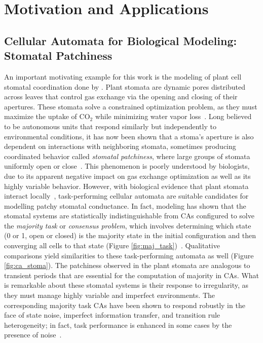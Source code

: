 \documentclass[a4paper,11pt]{report}
\begin{document}
\section{Motivation and Applications}
\label{sec:Motiv}
\subsection{Cellular Automata for Biological Modeling: Stomatal Patchiness}
\label{subsec:Stoma}
An important motivating example for this work is the modeling of plant cell stomatal coordination done by \citeauthor{pe04}. Plant stomata are dynamic pores distributed across leaves that control gas exchange via the opening and closing of their apertures. These stomata solve a constrained optimization problem, as they must maximize the uptake of CO$_\text{2}$ while minimizing water vapor loss~\cite{mo07,we11}. Long believed to be autonomous units that respond similarly but independently to environmental conditions, it has now been shown that a stoma's aperture is also dependent on interactions with neighboring stomata, sometimes producing coordinated behavior called \textit{stomatal patchiness}, where large groups of stomata uniformly open or close~\cite{pe04}. This phenomenon is poorly understood by biologists, due to its apparent negative impact on gas exchange optimization as well as its highly variable behavior. However, with biological evidence that plant stomata interact locally~\cite{pe04}, task-performing cellular automata are suitable candidates for modelling patchy stomatal conductance. In fact, modeling has shown that the stomatal systems are statistically indistinguishable from CAs configured to solve the \textit{majority task} or \textit{consensus problem}, which involves determining which state (0 or 1, open or closed) is the majority state in the initial configuration and then converging all cells to that state (Figure \ref{fig:maj_task})~\cite{gr15}. Qualitative comparisons yield similarities to these task-performing automata as well (Figure \ref{fig:ca_stoma}). The patchiness observed in the plant stomata are analogous to transient periods that are essential for the computation of majority in CAs. What is remarkable about these stomatal systems is their response to irregularity, as they must manage highly variable and imperfect environments. The corresponding majority task CAs have been shown to respond robustly in the face of state noise, imperfect information transfer, and transition rule heterogeneity; in fact, task performance is enhanced in some cases by the presence of noise~\cite{me07}.
\end{document}
